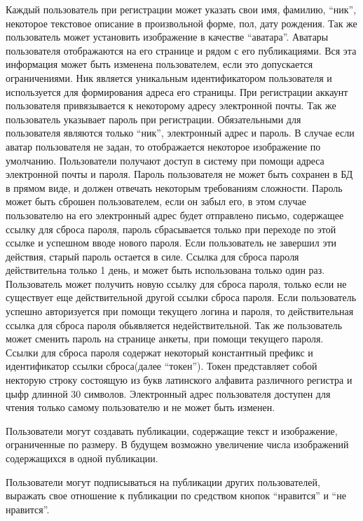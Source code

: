 Каждый пользователь при регистрации может указать свои имя,
фамилию, ``ник'', некоторое текстовое описание в произвольной форме, пол,
дату рождения.
Так же пользователь может установить изображение в качестве ``аватара''.
Аватары пользователя отображаются на его странице и рядом с его публикациями.
Вся эта информация может быть изменена пользователем,
если это допускается ограничениями.
Ник является уникальным идентификатором пользователя 
и используется для формирования адреса его страницы.
При регистрации аккаунт пользователя привязывается к некоторому адресу электронной
почты.
Так же пользователь указывает пароль при регистрации.
Обязательными для пользователя являются только ``ник'', электронный адрес и пароль.
В случае если аватар пользователя не задан, то отображается некоторое изображение
по умолчанию.
Пользователи получают доступ в систему при помощи адреса электронной почты и
пароля.
Пароль пользователя не может быть сохранен в БД в прямом виде, и должен отвечать
некоторым требованиям сложности.
Пароль может быть сброшен пользователем, если он забыл его,
в этом случае пользователю на его электронный адрес будет отправлено письмо,
содержащее ссылку для сброса пароля,
пароль сбрасывается только при переходе по этой ссылке
и успешном вводе нового пароля.
Если пользователь не завершил эти действия, старый пароль остается в силе.
Ссылка для сброса пароля действительна только 1 день,
и может быть использована только один раз.
Пользователь может получить новую ссылку для сброса пароля,
только если не существует еще действительной другой ссылки сброса пароля.
Если пользователь успешно авторизуется при помощи текущего логина и пароля, то
действительная ссылка для сброса пароля обьявляется недействительной.
Так же пользователь может сменить пароль на странице анкеты, при помощи текущего пароля.
Ссылки для сброса пароля содержат некоторый константный префикс и идентификатор ссылки сброса(далее ``токен'').
Токен представляет собой некторую строку состоящую из букв латинского
алфавита различного регистра и цыфр длинной 30 символов.
Электронный адрес пользователя доступен для чтения только самому пользователю
и не может быть изменен.

Пользователи могут создавать публикации, содержащие текст и изображение,
ограниченные по размеру.
В будущем возможно увеличение числа изображений содержащихся в одной публикации.



Пользователи могут подписываться на публикации других пользователей, 
выражать свое отношение к публикации по средством кнопок ``нравится'' и 
``не нравится''.

